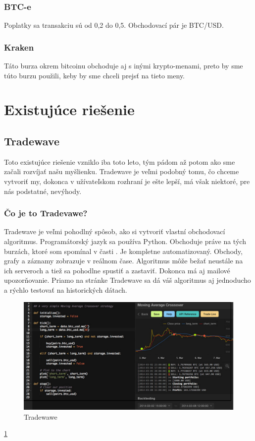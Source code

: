 \subsubsection{BTC-e} 
Poplatky sa transakciu sú od 0,2 do 0,5. Obchodovací pár je BTC/USD. \cite{BTC} 
\subsubsection{Kraken} 
Táto burza okrem bitcoinu obchoduje aj s inými krypto-menami, preto by sme túto burzu použili, keby by sme chceli prejsť na tieto meny. \cite{Kre} 
\section{Existujúce riešenie} 
\subsection{Tradewave} 
Toto existujúce riešenie vzniklo iba toto leto, tým pádom až potom ako sme začali rozvíjať našu myšlienku. Tradewave je veľmi podobný tomu, čo chceme vytvoriť my, dokonca v užívateľskom rozhraní je ešte lepší, má však niektoré, pre nás podstatné, nevýhody.  
\subsubsection{Čo je to Tradevawe?} 
Tradewave je veľmi pohodlný spôsob, ako si vytvoriť vlastní obchodovací algoritmus. Programátorský jazyk sa používa Python. Obchoduje práve na tých burzách, ktoré som spomínal v časti . Je kompletne automatizovaný. Obchody, grafy a záznamy zobrazuje v reálnom čase. Algoritmus môže bežať neustále na ich serveroch a tiež sa pohodlne spustiť a zastaviť. Dokonca má aj mailové upozorňovanie. Priamo na stránke Tradewave sa dá váš algoritmus aj jednoducho a rýchlo testovať na historických dátach.  \cite{Tw} 
\begin{figure}[!hbt] 
\begin{center} 
\includegraphics[width=1\textwidth]{trade} 
\caption{Tradewawe} 
\label{img:trade} 
\end{center} 
\end{figure} 
\ref{img:trade} 
